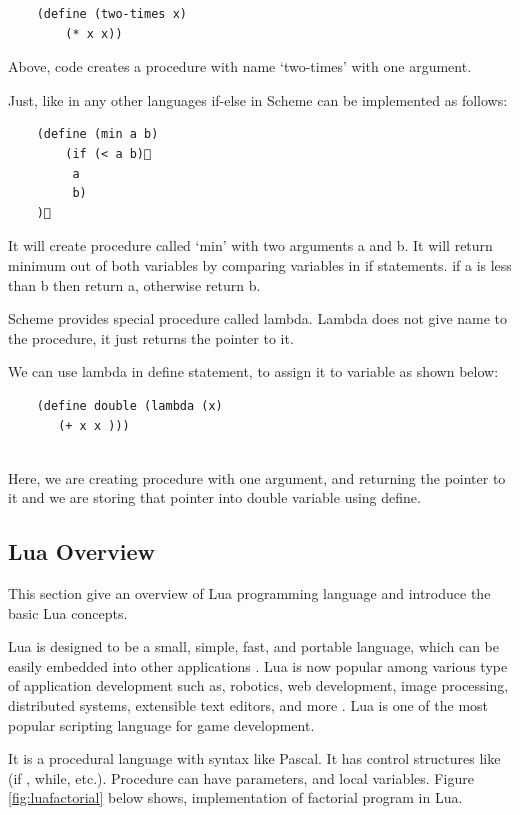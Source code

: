 \begin{lstlisting} 
	(define (two-times x)
		(* x x))
\end{lstlisting}


Above, code creates a procedure with name `two-times' with one argument. 

Just, like in any other languages if-else in Scheme can be implemented as follows:

\begin{lstlisting}
	(define (min a b)
		(if (< a b)
		 a	
		 b)
	)
\end{lstlisting}

It will create procedure called `min' with two arguments a and b. It will return minimum out of both variables by comparing variables in if statements. if a is less than b then return a, otherwise return b.

Scheme provides special procedure called lambda. Lambda does not give name to the procedure, it just returns the pointer to it.

We can use lambda in define statement, to assign it to variable as shown below:

\begin{lstlisting}
	(define double (lambda (x)
	   (+ x x )))
 
\end{lstlisting}


Here, we are creating procedure with one argument, and returning the pointer to it and we are storing that pointer into double variable using define.	 

\subsection{Lua Overview}

This section give an overview of Lua programming language \cite{Ierusalimschy:2006:LRM:1215067} and introduce the basic Lua concepts. 

Lua is designed to be a small, simple, fast, and portable language, which can be easily embedded into other applications \cite{spe96}. Lua is now popular among various type of application development such as, robotics, web development, image processing, distributed systems, extensible text editors, and more \cite{luaprojects}. Lua is one of the most popular scripting language for game development.

It is a procedural language with syntax like Pascal. It has control structures like (if , while, etc.). Procedure can have parameters, and local variables. Figure \ref{fig:luafactorial} below shows, implementation of factorial program in Lua.


